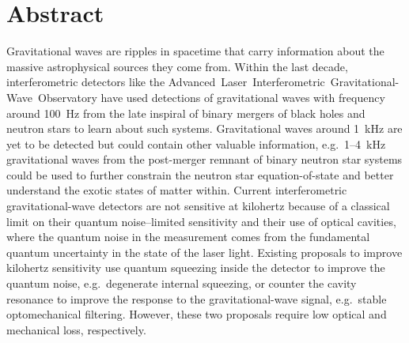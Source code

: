 \chapter*{Abstract}

Gravitational waves are ripples in spacetime that carry information about the massive astrophysical sources they come from. Within the last decade, interferometric detectors like the Advanced~Laser~Interferometric~Gravitational-Wave~Observatory have used detections of gravitational waves with frequency around 100~Hz from the late inspiral of binary mergers of black holes and neutron stars to learn about such systems.
Gravitational waves around 1~kHz are yet to be detected but could contain other valuable information, e.g.\ 1--4~kHz gravitational waves from the post-merger remnant of binary neutron star systems could be used to further constrain the neutron star equation-of-state and better understand the exotic states of matter within.
Current interferometric gravitational-wave detectors are not sensitive at kilohertz because of a classical limit on their quantum noise--limited sensitivity and their use of optical cavities, where the quantum noise in the measurement comes from the fundamental quantum uncertainty in the state of the laser light. Existing proposals to improve kilohertz sensitivity use quantum squeezing inside the detector to improve the quantum noise, e.g.\ degenerate internal squeezing, or counter the cavity resonance to improve the response to the gravitational-wave signal, e.g.\ stable optomechanical filtering. However, these two proposals require low optical and mechanical loss, respectively.

